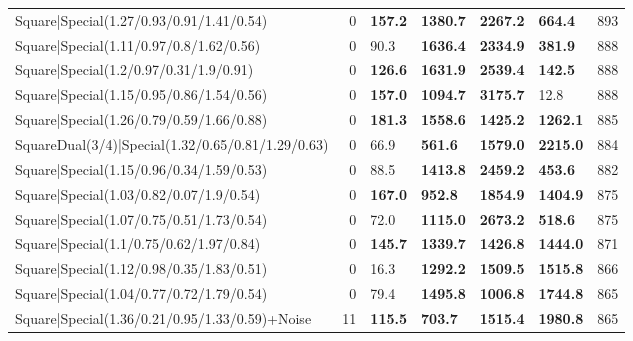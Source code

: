 \begin{tabular}{lrllllr}
 Square|Special(1.27/0.93/0.91/1.41/0.54)                      &             0   & \textbf{157.2} & \textbf{1380.7} & \textbf{2267.2} & \textbf{664.4}  &          893 \\
 Square|Special(1.11/0.97/0.8/1.62/0.56)                       &             0   & 90.3           & \textbf{1636.4} & \textbf{2334.9} & \textbf{381.9}  &          888 \\
 Square|Special(1.2/0.97/0.31/1.9/0.91)                        &             0   & \textbf{126.6} & \textbf{1631.9} & \textbf{2539.4} & \textbf{142.5}  &          888 \\
 Square|Special(1.15/0.95/0.86/1.54/0.56)                      &             0   & \textbf{157.0} & \textbf{1094.7} & \textbf{3175.7} & 12.8            &          888 \\
 Square|Special(1.26/0.79/0.59/1.66/0.88)                      &             0   & \textbf{181.3} & \textbf{1558.6} & \textbf{1425.2} & \textbf{1262.1} &          885 \\
 SquareDual(3/4)|Special(1.32/0.65/0.81/1.29/0.63)             &             0   & 66.9           & \textbf{561.6}  & \textbf{1579.0} & \textbf{2215.0} &          884 \\
 Square|Special(1.15/0.96/0.34/1.59/0.53)                      &             0   & 88.5           & \textbf{1413.8} & \textbf{2459.2} & \textbf{453.6}  &          882 \\
 Square|Special(1.03/0.82/0.07/1.9/0.54)                       &             0   & \textbf{167.0} & \textbf{952.8}  & \textbf{1854.9} & \textbf{1404.9} &          875 \\
 Square|Special(1.07/0.75/0.51/1.73/0.54)                      &             0   & 72.0           & \textbf{1115.0} & \textbf{2673.2} & \textbf{518.6}  &          875 \\
 Square|Special(1.1/0.75/0.62/1.97/0.84)                       &             0   & \textbf{145.7} & \textbf{1339.7} & \textbf{1426.8} & \textbf{1444.0} &          871 \\
 Square|Special(1.12/0.98/0.35/1.83/0.51)                      &             0   & 16.3           & \textbf{1292.2} & \textbf{1509.5} & \textbf{1515.8} &          866 \\
 Square|Special(1.04/0.77/0.72/1.79/0.54)                      &             0   & 79.4           & \textbf{1495.8} & \textbf{1006.8} & \textbf{1744.8} &          865 \\
 Square|Special(1.36/0.21/0.95/1.33/0.59)+Noise                &            11   & \textbf{115.5} & \textbf{703.7}  & \textbf{1515.4} & \textbf{1980.8} &          865 \\

\end{tabular}

